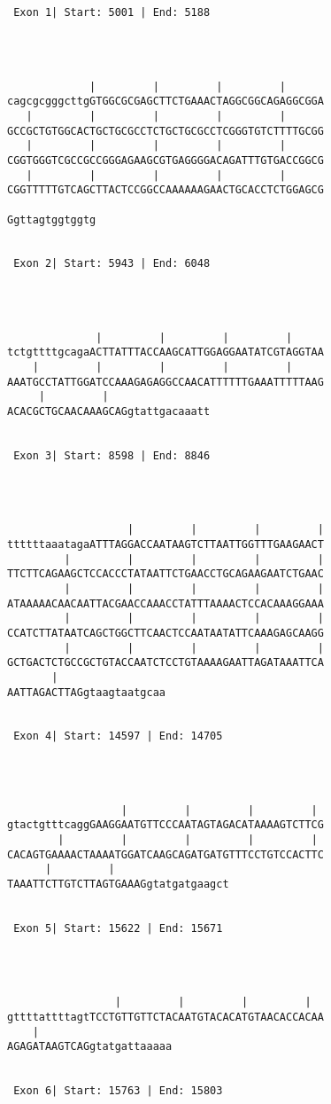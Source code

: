 \documentclass{article}
\begin{document}
\begin{Verbatim}


 Exon 1| Start: 5001 | End: 5188 




             |         |         |         |      
cagcgcgggcttgGTGGCGCGAGCTTCTGAAACTAGGCGGCAGAGGCGGA
   |         |         |         |         |      
GCCGCTGTGGCACTGCTGCGCCTCTGCTGCGCCTCGGGTGTCTTTTGCGG
   |         |         |         |         |      
CGGTGGGTCGCCGCCGGGAGAAGCGTGAGGGGACAGATTTGTGACCGGCG
   |         |         |         |         |      
CGGTTTTTGTCAGCTTACTCCGGCCAAAAAAGAACTGCACCTCTGGAGCG
 
Ggttagtggtggtg


 Exon 2| Start: 5943 | End: 6048 




              |         |         |         |     
tctgttttgcagaACTTATTTACCAAGCATTGGAGGAATATCGTAGGTAA
    |         |         |         |         |     
AAATGCCTATTGGATCCAAAGAGAGGCCAACATTTTTTGAAATTTTTAAG
     |         |   
ACACGCTGCAACAAAGCAGgtattgacaaatt


 Exon 3| Start: 8598 | End: 8846 




                   |         |         |         |
ttttttaaatagaATTTAGGACCAATAAGTCTTAATTGGTTTGAAGAACT
         |         |         |         |         |
TTCTTCAGAAGCTCCACCCTATAATTCTGAACCTGCAGAAGAATCTGAAC
         |         |         |         |         |
ATAAAAACAACAATTACGAACCAAACCTATTTAAAACTCCACAAAGGAAA
         |         |         |         |         |
CCATCTTATAATCAGCTGGCTTCAACTCCAATAATATTCAAAGAGCAAGG
         |         |         |         |         |
GCTGACTCTGCCGCTGTACCAATCTCCTGTAAAAGAATTAGATAAATTCA
       |    
AATTAGACTTAGgtaagtaatgcaa


 Exon 4| Start: 14597 | End: 14705 




                  |         |         |         | 
gtactgtttcaggGAAGGAATGTTCCCAATAGTAGACATAAAAGTCTTCG
        |         |         |         |         | 
CACAGTGAAAACTAAAATGGATCAAGCAGATGATGTTTCCTGTCCACTTC
      |         |     
TAAATTCTTGTCTTAGTGAAAGgtatgatgaagct


 Exon 5| Start: 15622 | End: 15671 




                 |         |         |         |  
gttttattttagtTCCTGTTGTTCTACAATGTACACATGTAACACCACAA
    |        
AGAGATAAGTCAGgtatgattaaaaa


 Exon 6| Start: 15763 | End: 15803 





\end{Verbatim}
\end{document}
